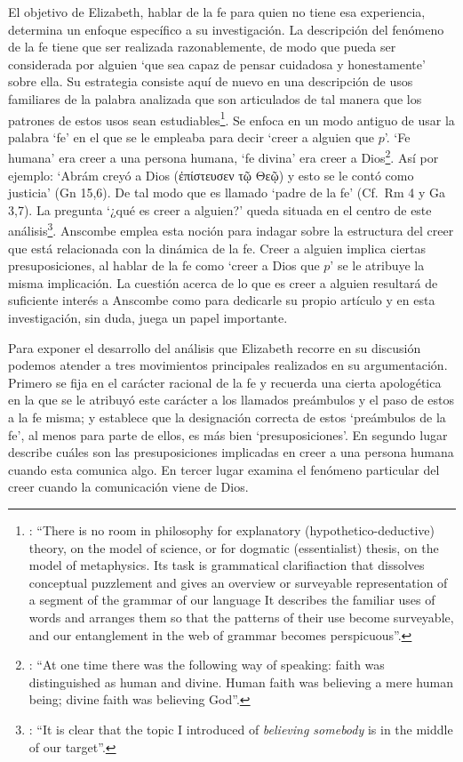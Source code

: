 El objetivo de Elizabeth, hablar de la fe para quien no tiene esa experiencia, determina un enfoque específico a su investigación. La descripción del fenómeno de la fe tiene que ser realizada razonablemente, de modo que pueda ser considerada por alguien \enquote*{que sea capaz de pensar cuidadosa y honestamente} sobre ella. Su estrategia consiste aquí de nuevo en una descripción de usos familiares de la palabra analizada que son articulados de tal manera que los patrones de estos usos sean estudiables\footnote{\cite[Cf.][12]{bakerhacker2009understanding}: \enquote{There is no room in philosophy for explanatory (hypothetico-deductive) theory, on the model of science, or for dogmatic (essentialist) thesis, on the model of metaphysics. Its task is grammatical clarifiaction that dissolves conceptual puzzlement and gives an overview or surveyable representation of a segment of the grammar of our language \textelp{} It describes the familiar uses of words and arranges them so that the patterns of their use become surveyable, and our entanglement in the web of grammar becomes perspicuous}.}. Se enfoca en un modo antiguo de usar la palabra `fe' en el que se le empleaba para decir \enquote*{creer a alguien que $p$}. `Fe humana' era creer a una persona humana, `fe divina' era creer a Dios\footnote{\cite[Cf.][2]{anscombe2008faith:tobelieve}: \enquote{At one time there was the following way of speaking: faith was distinguished as human and divine. Human faith was believing a mere human being; divine faith was believing God}.}. Así por ejemplo: \enquote*{Abrám creyó a Dios (\textgreek{ἐπίστευσεν τῷ Θεῷ}) y esto se le contó como justicia} (Gn 15,6). De tal modo que es llamado \enquote*{padre de la fe} (Cf.~Rm 4 y Ga 3,7). La pregunta \enquote*{¿qué es creer a alguien?} queda situada en el centro de este análisis\footnote{\cite[Cf.][116]{anscombe1981erp:faith}: \enquote{It is clear that the topic I introduced of \emph{believing somebody} is in the middle of our target}.}. Anscombe emplea esta noción para indagar sobre la estructura del creer que está relacionada con la dinámica de la fe. Creer a alguien implica ciertas presuposiciones, al hablar de la fe como \enquote*{creer a Dios que $p$} se le atribuye la misma implicación. La cuestión acerca de lo que es creer a alguien resultará de suficiente interés a Anscombe como para dedicarle su propio artículo y en esta investigación, sin duda, juega un papel importante.

Para exponer el desarrollo del análisis que Elizabeth recorre en su discusión podemos atender a tres movimientos principales realizados en su argumentación. Primero se fija en el carácter racional de la fe y recuerda una cierta apologética en la que se le atribuyó este carácter a los llamados preámbulos y el paso de estos a la fe misma; y establece que la designación correcta de estos `preámbulos de la fe', al menos para parte de ellos, es más bien `presuposiciones'. En segundo lugar describe cuáles son las presuposiciones implicadas en creer a una persona humana cuando esta comunica algo. En tercer lugar examina el fenómeno particular del creer cuando la comunicación viene de Dios.

